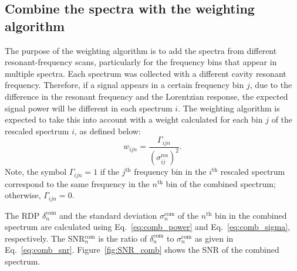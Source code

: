 
\subsection{Combine the spectra with the weighting algorithm} 
\label{sec:weighting_algorithm}

The purpose of the weighting algorithm is to add the spectra from different 
resonant-frequency scans,
 particularly for the frequency bins that appear in multiple spectra.  
Each spectrum was collected with a different cavity resonant frequency. 
Therefore, if a signal appears in a certain frequency bin $j$, due to the
 difference in the resonant frequency and the Lorentzian response, the 
expected signal
 power will be different in each spectrum $i$. The weighting algorithm is 
expected to take this into account with a weight calculated for each bin $j$ of
 the rescaled spectrum $i$, as defined below: %
\begin{equation}
    \label{eq:weight}
    {w_{ijn}} = \frac{\Gamma_{ijn}}{(\sigma_{ij}^\text{res})^{2}}.
\end{equation}
Note, the symbol $\Gamma_{ijn}=1$ if the $j^\text{th}$ frequency bin in the 
$i^\text{th}$ rescaled spectrum correspond to the same frequency in 
the $n^\text{th}$ bin of the combined spectrum; otherwise, $\Gamma_{ijn}=0$.

The RDP $\delta^\text{com}_{n}$ and the standard deviation 
$\sigma^\text{com}_{n}$ of the $n^\text{th}$ bin in the combined spectrum are 
calculated using Eq.~\eqref{eq:comb_power} and Eq.~\eqref{eq:comb_sigma}, 
respectively. The SNR$^\text{com}_{n}$ is the ratio of 
$\delta^\text{com}_{n}$ to 
$\sigma^\text{com}_{n}$ as given in Eq.~\eqref{eq:comb_snr}. 
Figure~\ref{fig:SNR_comb} shows the SNR of the combined spectrum. 

